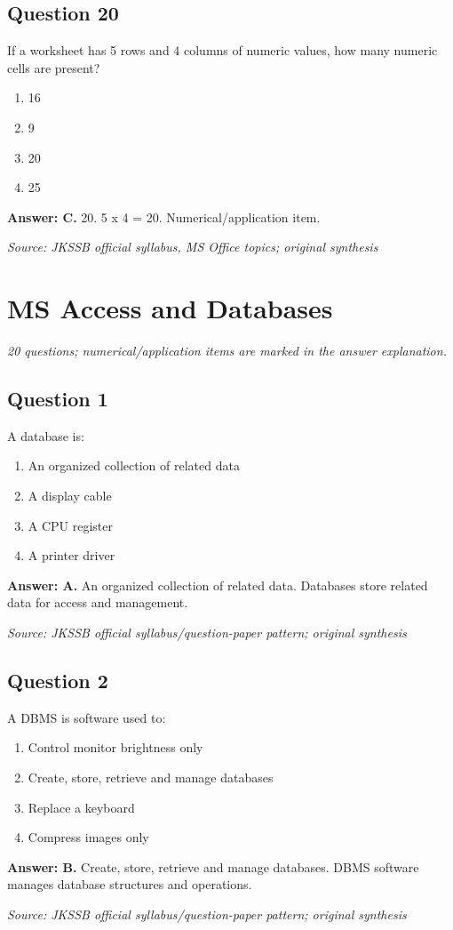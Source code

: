\documentclass[11pt,a4paper]{book}
\newcommand{\source}[1]{\par\smallskip\textit{Source: #1}}
\newcommand{\answer}[2]{\par\textbf{Answer: #1.} #2}
\begin{document}
\section*{Question 20}
If a worksheet has 5 rows and 4 columns of numeric values, how many numeric cells are present?
\begin{enumerate}[label=\Alph*.]
\item 16
\item 9
\item 20
\item 25
\end{enumerate}
\answer{C}{20. 5 x 4 = 20. Numerical/application item.}
\source{JKSSB official syllabus, MS Office topics; original synthesis}

\chapter{MS Access and Databases}
\textit{20 questions; numerical/application items are marked in the answer explanation.}
\section*{Question 1}
A database is:
\begin{enumerate}[label=\Alph*.]
\item An organized collection of related data
\item A display cable
\item A CPU register
\item A printer driver
\end{enumerate}
\answer{A}{An organized collection of related data. Databases store related data for access and management.}
\source{JKSSB official syllabus/question-paper pattern; original synthesis}
\section*{Question 2}
A DBMS is software used to:
\begin{enumerate}[label=\Alph*.]
\item Control monitor brightness only
\item Create, store, retrieve and manage databases
\item Replace a keyboard
\item Compress images only
\end{enumerate}
\answer{B}{Create, store, retrieve and manage databases. DBMS software manages database structures and operations.}
\source{JKSSB official syllabus/question-paper pattern; original synthesis}
\end{document}
